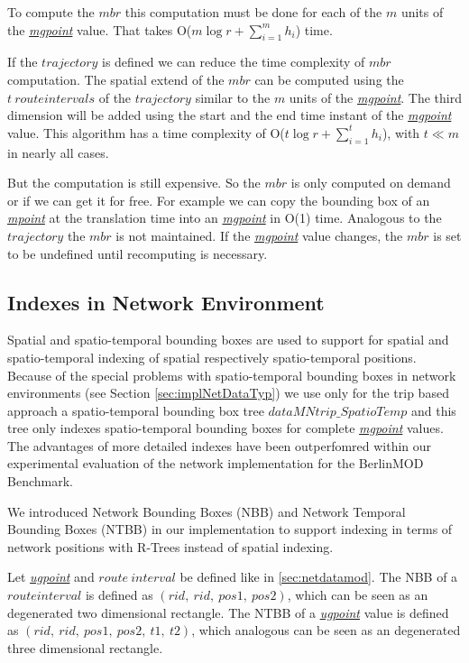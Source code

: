 \documentclass[a4paper]{article}
\newcommand{\bmodb} {BerlinMOD Benchmark}
\newcommand{\dt}[1]{\textsl{\underline{#1}}}
\begin{document}
To compute the $mbr$ this computation must be done for each of the $m$ units of
the \dt{mgpoint} value. That takes O($m \log {r} + \sum_{i=1}^{m}{h_i}$) time.

If the $trajectory$ is defined we can reduce the time complexity of $mbr$
computation. The spatial extend of the $mbr$ can be computed
using the $t\ route intervals$ of the $trajectory$ similar to the $m$ units of
the \dt{mgpoint}. The third dimension will be added using the start and the end
time instant of the \dt{mgpoint} value. This algorithm has a time complexity of
O($t \log {r} + \sum_{i=1}^{t}{h_i}$), with $t \ll m$ in nearly all cases.

But the computation is still expensive. So the $mbr$ is only computed on demand
or if we can get it for free. For example we can copy
the bounding box of an \dt{mpoint} at the translation time into an \dt{mgpoint}
in O(1) time.
Analogous to the $trajectory$ the $mbr$ is not maintained. If
the \dt{mgpoint} value changes, the $mbr$ is set to be undefined until recomputing
is necessary.

\subsection{Indexes in Network Environment}
\label{sec:implNetIndex}
Spatial and spatio-temporal bounding boxes are used to support for spatial
and spatio-temporal indexing of spatial respectively spatio-temporal positions.
Because of the special problems with spatio-temporal bounding boxes in network
environments (see Section \ref{sec:implNetDataTyp}) we use only for the trip
based approach a spatio-temporal bounding box tree $dataMNtrip\_SpatioTemp$ and
this tree only indexes spatio-temporal bounding boxes for complete \dt{mgpoint}
values. The advantages of more detailed indexes have been outperfomred within
our experimental evaluation of the network implementation for the \bmodb{}.

We introduced Network Bounding Boxes (NBB) and Network Temporal Bounding Boxes
(NTBB) in our implementation to support indexing in terms of network positions
with R-Trees instead of spatial indexing.

Let \dt{ugpoint} and $route\ interval$ be defined like in \ref{sec:netdatamod}.
The NBB of a $route interval$ is defined as $(rid,\ rid,\ pos1,\ pos2)$,
which can be seen as an degenerated two dimensional rectangle.
The NTBB of a \dt{ugpoint} value is defined as $(rid,\ rid,\ pos1,\ pos2,\ t1,\ t2)$,
which analogous can be seen as an degenerated three dimensional rectangle.
\end{document}
